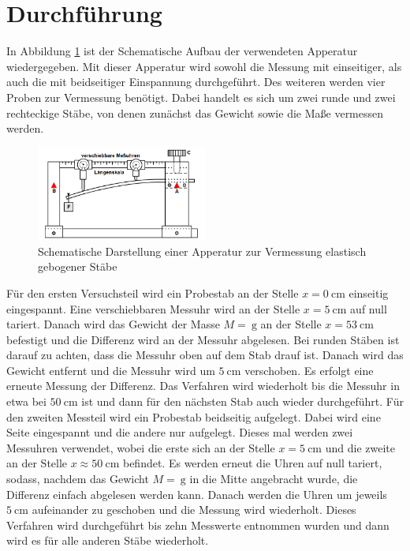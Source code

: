 \section{Durchführung}
\label{sec:Durchführung}
In Abbildung \ref{fig:aufbau} ist der Schematische Aufbau der verwendeten Apperatur wiedergegeben. 
Mit dieser Apperatur wird sowohl die Messung mit einseitiger, als auch die mit beidseitiger Einspannung durchgeführt.
Des weiteren werden vier Proben zur Vermessung benötigt. Dabei handelt es sich um zwei runde und zwei rechteckige Stäbe, von denen zunächst das Gewicht sowie die Maße vermessen werden.
\begin{figure}
    \centering
    \caption{Schematische Darstellung einer Apperatur zur Vermessung elastisch gebogener Stäbe \cite{v103}}
    \label{fig:aufbau}
    \includegraphics[width=0.5\textwidth]{pics/aufbau.png}
\end{figure}
Für den ersten Versuchsteil wird ein Probestab an der Stelle $x=\SI{0}{\centi\metre}$ einseitig eingespannt. Eine verschiebbaren Messuhr wird an der Stelle $x=\SI{5}{\centi\metre}$ auf null tariert. Danach wird das Gewicht der Masse $M=\SI{}{\gram}$ an der
Stelle $x=\SI{53}{\centi\metre}$ befestigt und die Differenz wird an der Messuhr abgelesen. Bei runden Stäben ist darauf zu achten, dass die Messuhr oben auf dem Stab drauf ist.
Danach wird das Gewicht entfernt und die Messuhr wird um $\SI{5}{\centi\metre}$ verschoben. Es erfolgt eine erneute Messung der Differenz. Das Verfahren wird wiederholt bis die Messuhr in etwa bei 
$\SI{50}{\centi\metre}$ ist und dann für den nächsten Stab auch wieder durchgeführt.
Für den zweiten Messteil wird ein Probestab beidseitig aufgelegt. Dabei wird eine Seite eingespannt und die andere nur aufgelegt. Dieses mal werden zwei Messuhren verwendet, wobei die erste sich an der Stelle $x=\SI{5}{\centi\metre}$ und die zweite an der Stelle
$x \approx \SI{50}{\centi\metre}$ befindet. Es werden erneut die Uhren auf null tariert, sodass, nachdem das Gewicht $M=\SI{}{\gram}$ in die Mitte angebracht wurde, die Differenz einfach abgelesen werden kann.
Danach werden die Uhren um jeweils $\SI{5}{\centi\metre}$ aufeinander zu geschoben und die Messung wird wiederholt. Dieses Verfahren wird durchgeführt bis zehn Messwerte entnommen wurden und dann wird es für alle anderen Stäbe wiederholt.
